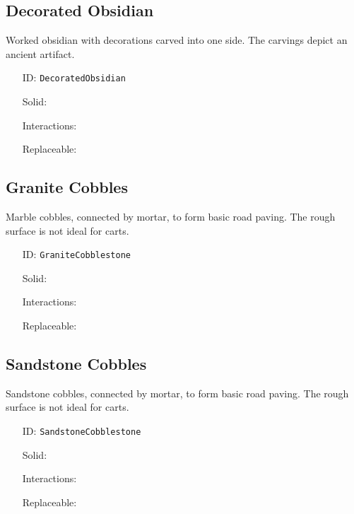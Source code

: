 \subsection{Decorated Obsidian}\label{subsec:blocks_decorated obsidian}
Worked obsidian with decorations carved into one side.
                The carvings depict an ancient artifact.
\newline
\begin{itemize}[nosep]
\item[ID:] \texttt{DecoratedObsidian}
\item[Solid:]  \Checkmark \item[Interactions:]  \XSolidBrush \item[Replaceable:]  \XSolidBrush \end{itemize}

\subsection{Granite Cobbles}\label{subsec:blocks_granite cobbles}
Marble cobbles, connected by mortar, to form basic road paving.
                The rough surface is not ideal for carts.
\newline
\begin{itemize}[nosep]
\item[ID:] \texttt{GraniteCobblestone}
\item[Solid:]  \Checkmark \item[Interactions:]  \XSolidBrush \item[Replaceable:]  \XSolidBrush \end{itemize}

\subsection{Sandstone Cobbles}\label{subsec:blocks_sandstone cobbles}
Sandstone cobbles, connected by mortar, to form basic road paving.
                The rough surface is not ideal for carts.
\newline
\begin{itemize}[nosep]
\item[ID:] \texttt{SandstoneCobblestone}
\item[Solid:]  \Checkmark \item[Interactions:]  \XSolidBrush \item[Replaceable:]  \XSolidBrush \end{itemize}

